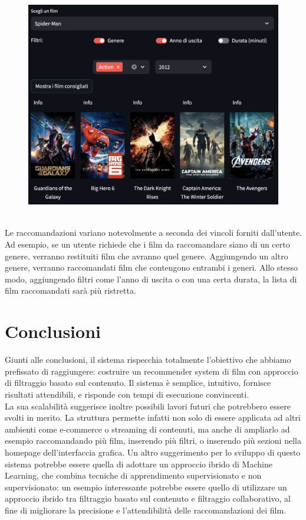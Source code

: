 \documentclass{report}
\begin{document}
        \begin{figure}[h]
            \centering
            \includegraphics[width=1\linewidth]{screenshot/ricerca_filters.png}
        \end{figure}
        \\Le raccomandazioni variano notevolmente a seconda dei vincoli forniti dall’utente. Ad esempio, se un utente richiede che i film da raccomandare siano di un certo genere, verranno restituiti film che avranno quel genere. Aggiungendo un altro genere, verranno raccomandati film che contengono entrambi i generi. Allo stesso modo, aggiungendo filtri come l'anno di uscita o con una certa durata, la lista di film raccomandati sarà più ristretta.

\chapter{Conclusioni}
Giunti alle conclusioni, il sistema rispecchia totalmente l'obiettivo che abbiamo prefissato di raggiungere: costruire un recommender system di film con approccio di filtraggio basato sul contenuto. Il sistema è semplice, intuitivo, fornisce risultati attendibili, e risponde con tempi di esecuzione convincenti. \\
La sua scalabilità suggerisce inoltre possibili lavori futuri che potrebbero essere svolti in merito. La struttura permette infatti non solo di essere applicata ad altri ambienti come e-commerce o streaming di contenuti, ma anche di ampliarlo ad esempio raccomandando più film, inserendo più filtri, o inserendo più sezioni nella homepage dell'interfaccia grafica. 
Un altro suggerimento per lo sviluppo di questo sistema potrebbe essere quella di adottare un approccio ibrido di Machine Learning, che combina tecniche di apprendimento supervisionato e non supervisionato: un esempio interessante potrebbe essere quello di utilizzare un approccio ibrido tra filtraggio basato sul contenuto e filtraggio collaborativo, al fine di migliorare la precisione e l'attendibilità delle raccomandazioni dei film.
\end{document}
